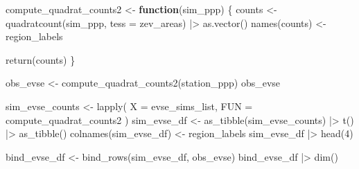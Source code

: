 \documentclass[
  letterpaper,
  DIV=11,
  numbers=noendperiod]{scrartcl}
\newenvironment{Shaded}{\begin{snugshade}}{\end{snugshade}}
\newcommand{\AttributeTok}[1]{\textcolor[rgb]{0.40,0.45,0.13}{#1}}
\newcommand{\ControlFlowTok}[1]{\textcolor[rgb]{0.00,0.23,0.31}{\textbf{#1}}}
\newcommand{\DecValTok}[1]{\textcolor[rgb]{0.68,0.00,0.00}{#1}}
\newcommand{\FunctionTok}[1]{\textcolor[rgb]{0.28,0.35,0.67}{#1}}
\newcommand{\NormalTok}[1]{\textcolor[rgb]{0.00,0.23,0.31}{#1}}
\newcommand{\OtherTok}[1]{\textcolor[rgb]{0.00,0.23,0.31}{#1}}
\newcommand{\SpecialCharTok}[1]{\textcolor[rgb]{0.37,0.37,0.37}{#1}}
\begin{document}
\begin{tcolorbox}[enhanced jigsaw, rightrule=.15mm, bottomrule=.15mm, left=2mm, breakable, leftrule=.75mm, colback=white, opacityback=0, arc=.35mm, toprule=.15mm, colframe=quarto-callout-note-color-frame]
\begin{minipage}[t]{\textwidth - 5.5mm}
\begin{Shaded}
\begin{Highlighting}[]
\NormalTok{compute\_quadrat\_counts2 }\OtherTok{\textless{}{-}} \ControlFlowTok{function}\NormalTok{(sim\_ppp) \{}
\NormalTok{  counts }\OtherTok{\textless{}{-}} \FunctionTok{quadratcount}\NormalTok{(sim\_ppp, }\AttributeTok{tess =}\NormalTok{ zev\_areas) }\SpecialCharTok{|\textgreater{}} \FunctionTok{as.vector}\NormalTok{()}
  \FunctionTok{names}\NormalTok{(counts) }\OtherTok{\textless{}{-}}\NormalTok{ region\_labels}

  \FunctionTok{return}\NormalTok{(counts)}
\NormalTok{\}}
\end{Highlighting}
\end{Shaded}

\begin{Shaded}
\begin{Highlighting}[]
\NormalTok{obs\_evse }\OtherTok{\textless{}{-}} \FunctionTok{compute\_quadrat\_counts2}\NormalTok{(station\_ppp)}
\NormalTok{obs\_evse}
\end{Highlighting}
\end{Shaded}

\begin{Shaded}
\begin{Highlighting}[]
\NormalTok{sim\_evse\_counts }\OtherTok{\textless{}{-}} \FunctionTok{lapply}\NormalTok{(}
  \AttributeTok{X =}\NormalTok{ evse\_sims\_list,}
  \AttributeTok{FUN =}\NormalTok{ compute\_quadrat\_counts2}
\NormalTok{)}
\NormalTok{sim\_evse\_df }\OtherTok{\textless{}{-}} \FunctionTok{as\_tibble}\NormalTok{(sim\_evse\_counts) }\SpecialCharTok{|\textgreater{}} \FunctionTok{t}\NormalTok{() }\SpecialCharTok{|\textgreater{}} \FunctionTok{as\_tibble}\NormalTok{()}
\FunctionTok{colnames}\NormalTok{(sim\_evse\_df) }\OtherTok{\textless{}{-}}\NormalTok{ region\_labels}
\NormalTok{sim\_evse\_df }\SpecialCharTok{|\textgreater{}} \FunctionTok{head}\NormalTok{(}\DecValTok{4}\NormalTok{)}
\end{Highlighting}
\end{Shaded}

\begin{Shaded}
\begin{Highlighting}[]
\NormalTok{bind\_evse\_df }\OtherTok{\textless{}{-}} \FunctionTok{bind\_rows}\NormalTok{(sim\_evse\_df, obs\_evse)}
\NormalTok{bind\_evse\_df }\SpecialCharTok{|\textgreater{}} \FunctionTok{dim}\NormalTok{()}
\end{Highlighting}
\end{Shaded}


\end{minipage}
\end{tcolorbox}
\end{document}

